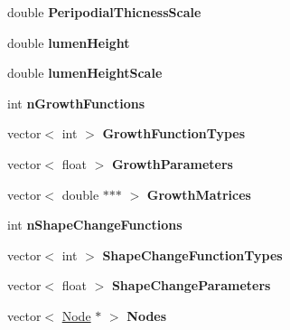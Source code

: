 \begin{DoxyCompactItemize}
\item 
\hypertarget{classSimulation_a1b5fd33e66ce33ae07ba854785735162}{}double {\bfseries Peripodial\+Thicness\+Scale}\label{classSimulation_a1b5fd33e66ce33ae07ba854785735162}

\item 
\hypertarget{classSimulation_a661531b9180d4b893f4f0221fe518b7b}{}double {\bfseries lumen\+Height}\label{classSimulation_a661531b9180d4b893f4f0221fe518b7b}

\item 
\hypertarget{classSimulation_a1a4bdb2cb7810665b95bd884dfa19adc}{}double {\bfseries lumen\+Height\+Scale}\label{classSimulation_a1a4bdb2cb7810665b95bd884dfa19adc}

\item 
\hypertarget{classSimulation_a47187b5d7f450b1c41e6fdaffeedc207}{}int {\bfseries n\+Growth\+Functions}\label{classSimulation_a47187b5d7f450b1c41e6fdaffeedc207}

\item 
\hypertarget{classSimulation_aa94f0cfa6a70cc5bcfee5ba7eecb8dd4}{}vector$<$ int $>$ {\bfseries Growth\+Function\+Types}\label{classSimulation_aa94f0cfa6a70cc5bcfee5ba7eecb8dd4}

\item 
\hypertarget{classSimulation_ad4e55d4978e84f7fc8db37b37056015e}{}vector$<$ float $>$ {\bfseries Growth\+Parameters}\label{classSimulation_ad4e55d4978e84f7fc8db37b37056015e}

\item 
\hypertarget{classSimulation_a8cdab34c42a949aeeaa2b76fe5cf7d76}{}vector$<$ double $\ast$$\ast$$\ast$ $>$ {\bfseries Growth\+Matrices}\label{classSimulation_a8cdab34c42a949aeeaa2b76fe5cf7d76}

\item 
\hypertarget{classSimulation_a74251252e9f320268055537749d674c1}{}int {\bfseries n\+Shape\+Change\+Functions}\label{classSimulation_a74251252e9f320268055537749d674c1}

\item 
\hypertarget{classSimulation_ac14e1aef8560da7de811fb3f29010dc0}{}vector$<$ int $>$ {\bfseries Shape\+Change\+Function\+Types}\label{classSimulation_ac14e1aef8560da7de811fb3f29010dc0}

\item 
\hypertarget{classSimulation_a92336ab44094ea95f48549c511815764}{}vector$<$ float $>$ {\bfseries Shape\+Change\+Parameters}\label{classSimulation_a92336ab44094ea95f48549c511815764}

\item 
\hypertarget{classSimulation_a51e3f02b266fd5156a1d78054f1dac37}{}vector$<$ \hyperlink{classNode}{Node} $\ast$ $>$ {\bfseries Nodes}\label{classSimulation_a51e3f02b266fd5156a1d78054f1dac37}


\end{DoxyCompactItemize}
